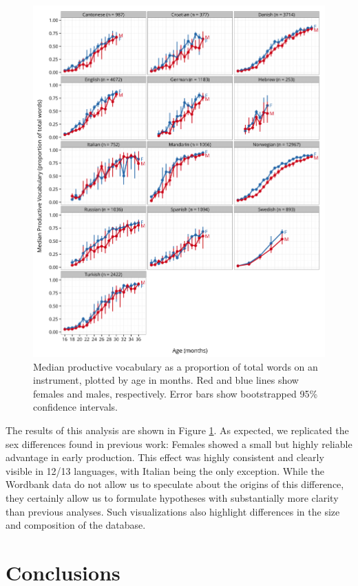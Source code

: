 \documentclass[doc,noapacite]{apa2}
\begin{document}
\begin{figure}[h!]
\includegraphics[width=6in]{figures/sex.png}
\caption{\label{fig:sex} Median productive vocabulary as a proportion of total words on an instrument, plotted by age in months. Red and blue lines show females and males, respectively. Error bars show bootstrapped 95\% confidence intervals.}
\end{figure}

The results of this analysis are shown in Figure \ref{fig:sex}. As expected, we replicated the sex differences found in previous work: Females showed a small but highly reliable advantage in early production. This effect was highly consistent and clearly visible in 12/13 languages, with Italian being the only exception. While the Wordbank data do not allow us to speculate about the origins of this difference, they certainly allow us to formulate hypotheses with substantially more clarity than previous analyses. Such visualizations also highlight differences in the size and composition of the database.

\section{Conclusions}
\end{document}
